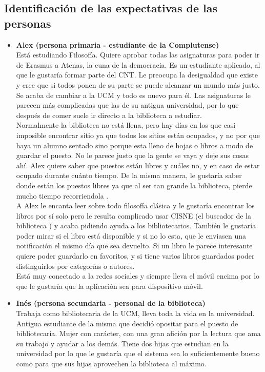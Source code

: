 \documentclass[12pt]{article}
\begin{document}
\subsection{Identificación de las expectativas de las personas}
\begin{itemize}[noitemsep]

\item \textbf{Alex (persona primaria - estudiante de la Complutense)} \\
Está estudiando Filosofía. Quiere aprobar todas las asignaturas para poder ir de Erasmus a Atenas, la cuna de la democracia. Es un estudiante aplicado, al que le gustaría formar parte del CNT. Le preocupa  la desigualdad que existe y cree que si todos ponen de su parte se puede alcanzar un mundo más justo.
Se acaba de cambiar  a la UCM y todo es nuevo para él. Las asignaturas le parecen más complicadas que las de su antigua universidad, por lo que después de comer suele ir directo a la biblioteca a estudiar.\\

Normalmente la biblioteca no está llena, pero hay días en los que casi imposible encontrar sitio ya que todos los  sitios están ocupados, y no por que haya un alumno sentado sino porque esta lleno de hojas o libros a modo de guardar el puesto. No le parece justo que la gente se vaya y deje sus cosas ahí. Alex quiere saber que puestos están libres y cuáles no, y en caso de estar ocupado durante cuánto tiempo. De la misma manera, le gustaría saber donde están los puestos libres ya que al ser tan grande la biblioteca, pierde mucho tiempo recorriendola .\\

A Alex le encanta leer sobre todo filosofía clásica y le gustaría encontrar los libros por sí solo pero le resulta complicado usar CISNE (el buscador de la biblioteca ) y acaba pidiendo ayuda a los bibliotecarios. También le gustaría poder mirar si el libro está disponible y si no lo esta, que le enviasen una notificación el mismo día que sea devuelto. Si un libro le parece interesante quiere poder guardarlo en favoritos, y si tiene varios libros guardados poder distinguirlos por categorías o autores.\\

Está muy conectado a la redes sociales y siempre lleva el móvil encima por lo que le gustaría que la aplicación sea para dispositivo móvil.\\

\item \textbf{Inés (persona secundaria - personal de la biblioteca)} \\
	Trabaja como bibliotecaria de la UCM, lleva toda la vida en la universidad. Antigua estudiante de la misma que decidió opositar para el puesto de bibliotecaria. Mujer con carácter, con una gran afición por la lectura que ama su trabajo y ayudar a los demás. Tiene dos hijas que estudian en la universidad por lo que le gustaría que el sistema sea lo suficientemente bueno como para que sus hijas aprovechen la biblioteca al máximo.\\


\end{itemize}
\end{document}
